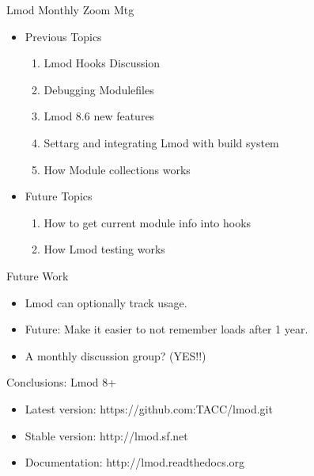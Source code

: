 \documentclass{beamer}
\begin{document}
\begin{frame}{Lmod Monthly Zoom Mtg}
  \begin{itemize}
    \item Previous Topics
      \begin{enumerate}
        \item Lmod Hooks Discussion
        \item Debugging Modulefiles
        \item Lmod 8.6 new features
        \item Settarg and integrating Lmod with build system
        \item How Module collections works 
      \end{enumerate}
    \item Future Topics
      \begin{enumerate}
        \item How to get current module info into hooks
        \item How Lmod testing works
      \end{enumerate}
  \end{itemize}
\end{frame}

\begin{frame}{Future Work}
  \begin{itemize}
    \item Lmod can optionally track usage.
    \item Future: Make it easier to not remember loads after 1 year.
    \item A monthly discussion group? (YES!!)
  \end{itemize}
\end{frame}

\begin{frame}{Conclusions: Lmod 8+}
  \begin{itemize}
    \item Latest version: https://github.com:TACC/lmod.git
    \item Stable version: http://lmod.sf.net
    \item Documentation:  http://lmod.readthedocs.org
  \end{itemize}
\end{frame}
\end{document}
